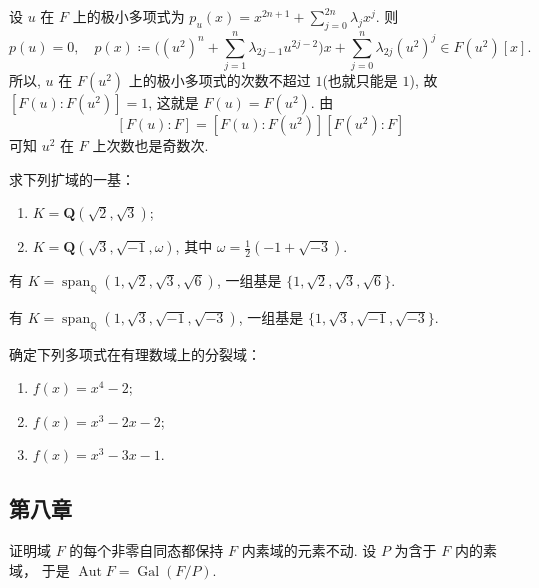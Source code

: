 \begin{solution}
    设 $u$ 在 $F$ 上的极小多项式为 $p_{u}(x)=x^{2n+1}+\sum_{j=0}^{2n}\lambda_{j}x^{j}$. 
    则 
        \[
            p(u)=0,\quad p(x)\coloneqq \Big((u^{2})^{n}+\sum_{j=1}^{n}\lambda_{2j-1}u^{2j-2}\Big)x+\sum_{j=0}^{n}\lambda_{2j}(u^{2})^{j}\in F(u^{2})[x].
        \]
    所以, $u$ 在 $F(u^{2})$ 上的极小多项式的次数不超过 $1$(也就只能是 $1$), 故 $[F(u):F(u^{2})]=1$, 这就是 $F(u)=F(u^{2})$. 由 
        \[
            [F(u):F]=[F(u):F(u^{2})] [F(u^{2}):F]
        \]
    可知 $u^{2}$ 在 $F$ 上次数也是奇数次.
\end{solution}

\setcounter{pb}{6}
\begin{problem}
    求下列扩域的一基：
    \begin{enumerate}[label=(\roman*)]
        \item $ K = \mathbf{Q}(\sqrt{2}, \sqrt{3}) $;
        \item $ K = \mathbf{Q}(\sqrt{3}, \sqrt{-1}, \omega) $, 其中 $ \omega = \frac{1}{2}(-1 + \sqrt{-3}) $.
    \end{enumerate}
\end{problem}

\begin{solution}
    有 $K=\operatorname{span}_{\mathbb{Q}}(1,\sqrt{2},\sqrt{3},\sqrt{6})$, 一组基是 $\{1,\sqrt{2},\sqrt{3},\sqrt{6}\}$.
    \par 有 $K=\operatorname{span}_{\mathbb{Q}}(1,\sqrt{3},\sqrt{-1},\sqrt{-3})$, 一组基是 $\{1,\sqrt{3},\sqrt{-1},\sqrt{-3}\}$.
\end{solution}

\setcounter{pb}{10}
\begin{problem}
    确定下列多项式在有理数域上的分裂域：
    \begin{enumerate}[label=(\roman*)]
        \item $ f(x) = x^4 - 2 $;
        \item $ f(x) = x^3 - 2x - 2 $;
        \item $ f(x) = x^3 - 3x - 1 $.
    \end{enumerate}
\end{problem}

\begin{solution}
    
\end{solution}

\subsection{第八章}
\setcounter{pb}{2}
\begin{problem}
    证明域 $ F $ 的每个非零自同态都保持 $ F $ 内素域的元素不动. 设 $ P $ 为含于 $ F $ 内的素域， 于是 $ \operatorname{Aut} F = \operatorname{Gal}(F/P) $.
\end{problem}

